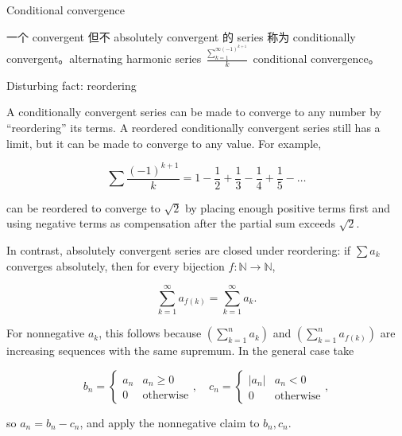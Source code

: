 \begin{definition}{Conditional convergence}

一个 convergent 但不 absolutely convergent 的 series 称为 conditionally convergent。alternating harmonic series \(\frac{\sum_{k = 1}^{{\infty{({- 1})}}^{k + 1}}}{k}\) conditional convergence。

\end{definition}

\begin{qlremark}{Disturbing fact: reordering}

A conditionally convergent series can be made to converge to any number by ``reordering'' its terms. A reordered conditionally convergent series still has a limit, but it can be made to converge to any value. For example,

\[\sum\frac{\left( {- 1} \right)^{k + 1}}{k} = 1 - \frac{1}{2} + \frac{1}{3} - \frac{1}{4} + \frac{1}{5} - \ldots\]

can be reordered to converge to \(\sqrt{2}\) by placing enough positive terms first and using negative terms as compensation after the partial sum exceeds \(\sqrt{2}\).

In contrast, absolutely convergent series are closed under reordering: if \(\sum a_{k}\) converges absolutely, then for every bijection \(f:\mathbb{N}\rightarrow\mathbb{N}\),

\[\sum\limits_{k = 1}^{\infty}a_{f{(k)}} = \sum\limits_{k = 1}^{\infty}a_{k}.\]

For nonnegative \(a_{k}\), this follows because \(\left( {\sum_{k = 1}^{n}a_{k}} \right)\) and \(\left( {\sum_{k = 1}^{n}a_{f{(k)}}} \right)\) are increasing sequences with the same supremum. In the general case take

\[b_{n} = \left\{ \begin{matrix}
a_{n} & {a_{n} \geq 0} \\
{0\ } & \text{otherwise}
\end{matrix} \right.,\quad c_{n} = \left\{ \begin{matrix}
\left| a_{n} \right| & {a_{n} < 0} \\
{0\ } & \text{otherwise}
\end{matrix} \right.,\]

so \(a_{n} = b_{n} - c_{n}\), and apply the nonnegative claim to \(b_{n},c_{n}\).

\end{qlremark}

